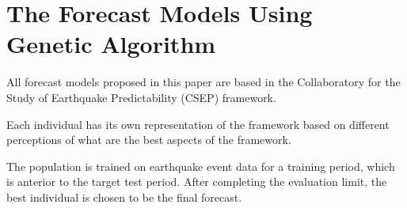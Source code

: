 %	
%
%

\section{The Forecast Models Using Genetic Algorithm}\label{Models}

All forecast models proposed in this paper are based in the
Collaboratory for the Study of Earthquake Predictability (CSEP)
framework.

Each individual has its own representation of the framework based on
different perceptions of what are the best aspects of the framework.

The population is trained on earthquake event data for a training
period, which is anterior to the target test period. After completing
the evaluation limit, the best individual is chosen to be the final
forecast.

